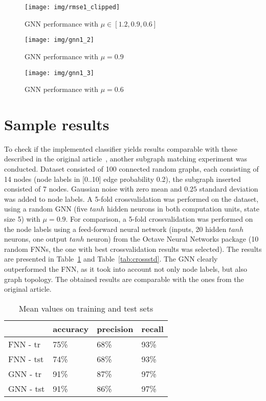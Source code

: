 \documentclass[]{spie}  %
\begin{document}
\begin{figure}[h!]
\begin{center}
	\texttt{[image: img/rmse1\_clipped]}
	\caption{GNN performance with $\mu \in [1.2, 0.9, 0.6]$}
	\label{fig:rmse}
\end{center}
\end{figure}

\begin{figure}[h!]
\begin{center}
	\texttt{[image: img/gnn1\_2]}
	\caption{GNN performance with $\mu = 0.9$}
	\label{fig:rmse1}
\end{center}
\end{figure}

\begin{figure}[h!]
\begin{center}
	\texttt{[image: img/gnn1\_3]}
	\caption{GNN performance with $\mu = 0.6$}
	\label{fig:rmse3}
\end{center}
\end{figure}

\section{Sample results}
To check if the implemented classifier yields results comparable with these described in the original article~\cite{scarselli2009graph}, another subgraph matching experiment was conducted. Dataset consisted of 100 connected random graphs, each consisting of 14 nodes (node labels in [0..10] edge probability 0.2), the subgraph inserted consisted of 7 nodes. Gaussian noise with zero mean and $0.25$ standard deviation was added to node labels. A 5-fold crossvalidation was performed on the dataset, using a random GNN (five $tanh$ hidden neurons in both computation units, state size 5) with $\mu = 0.9$. For comparison, a 5-fold crossvalidation was performed on the node labels using a feed-forward neural network (inputs, 20 hidden $tanh$ neurons, one output $tanh$ neuron) from the Octave Neural Networks package (10 random FNNs, the one with best crossvalidation results was selected). The results are presented in Table~\ref{tab:crossmean} and Table~\ref{tab:crossstd}. The GNN clearly outperformed the FNN, as it took into account not only node labels, but also graph topology. The obtained results are comparable with the ones from the original article.

\begin{table}[h!]
	\begin{center}
	\begin{tabular}{llll}
	\toprule
	& accuracy & precision & recall \\
	\midrule
	FNN - tr &	75\% &  68\% &  93\% \\
	FNN - tst &	74\% &  68\% &  93\% \\
	GNN - tr &	91\% &  87\% &  97\% \\
	GNN - tst &	91\% &  86\% &  97\% \\
	\bottomrule
	\end{tabular}
	\caption{Mean values on training and test sets}
	\label{tab:crossmean}
	\end{center}
\end{table}
\end{document}
